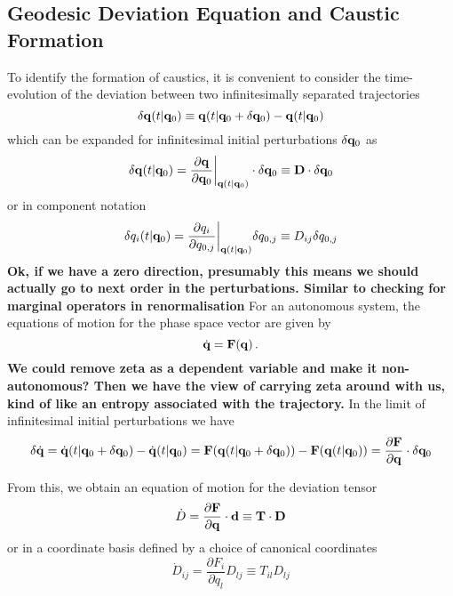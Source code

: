 \subsection{Geodesic Deviation Equation and Caustic Formation}
To identify the formation of caustics, it is convenient to consider the time-evolution of the deviation between two infinitesimally separated trajectories
\begin{equation}
  \delta{\bf q}(t|{\bf q}_0) \equiv {\bf q}(t|{\bf q}_0+\delta{\bf q}_0) - {\bf q}(t|{\bf q}_0)
\end{equation}
which can be expanded for infinitesimal initial perturbations $\delta{\bf q}_0$ as
\begin{equation}
  \delta{\bf q}(t|{\bf q}_0) = \frac{\partial {\bf q}}{\partial {\bf q}_0}\bigg|_{{\bf q}(t|{\bf q}_0)}\cdot\delta{\bf q}_0 \equiv {\bf D}\cdot\delta{\bf q}_0
\end{equation}
or in component notation
\begin{equation}
  \delta q_i(t|{\bf q}_0) = \frac{\partial q_i}{\partial q_{0,j}}\bigg|_{{\bf q}(t|{\bf q}_0)}\delta q_{0,j} \equiv D_{ij}\delta q_{0,j}
\end{equation}
{\bf Ok, if we have a zero direction, presumably this means we should actually go to next order in the perturbations.  Similar to checking for marginal operators in renormalisation}
For an autonomous system, the equations of motion for the phase space vector are given by
\begin{equation}
  \dot{{\bf q}} = {\bf F}({\bf q}) \, .
\end{equation}
{\bf We could remove zeta as a dependent variable and make it non-autonomous?  Then we have the view of carrying zeta around with us, kind of like an entropy associated with the trajectory.}
In the limit of infinitesimal initial perturbations we have
\begin{equation}
  \delta\dot{{\bf q}} = \dot{{\bf q}}(t|{\bf q}_0+\delta{\bf q}_0) - \dot{{\bf q}}(t|{\bf q}_0) = {\bf F}({\bf q}(t|{\bf q}_0+\delta{\bf q}_0)) - {\bf F}({\bf q}(t|{\bf q}_0)) = \frac{\partial {\bf F}}{\partial {\bf q}}\cdot\delta{\bf q}_0
\end{equation}

From this, we obtain an equation of motion for the deviation tensor
\begin{equation}
  \dot{D} = \frac{\partial{\bf F}}{\partial{\bf q}}\cdot {\bf d} \equiv {\bf T}\cdot {\bf D}
\end{equation}
or in a coordinate basis defined by a choice of canonical coordinates
\begin{equation}
  \dot{D}_{ij} = \frac{\partial F_i}{\partial q_l}D_{lj}\equiv T_{il}D_{lj}
\end{equation}

